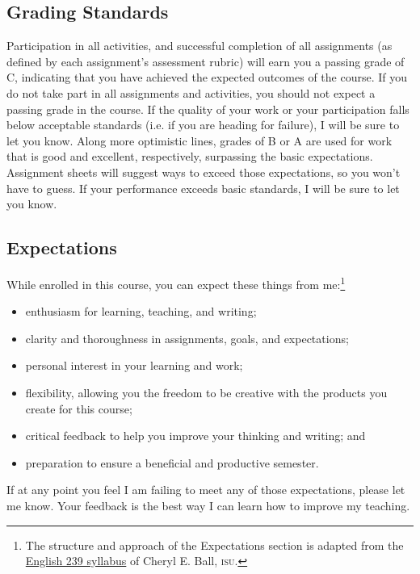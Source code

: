 \documentclass[11pt,oneside]{amsart}	%
\begin{document}
\subsection{Grading Standards} %
\label{sub:grading_standards}
Participation in all activities, and successful completion of all assignments (as defined by each assignment's assessment rubric) will earn you a passing grade of C, indicating that you have achieved the expected outcomes of the course. If you do not take part in all assignments and activities, you should not expect a passing grade in the course. If the quality of your work or your participation falls below acceptable standards (i.e. if you are heading for failure), I will be sure to let you know. Along more optimistic lines, grades of B or A are used for work that is good and excellent, respectively, surpassing the basic expectations. Assignment sheets will suggest ways to exceed those expectations, so you won't have to guess. If your performance exceeds basic standards, I will be sure to let you know.





\subsection{Expectations} %
\label{sub:expectations}

While enrolled in this course, you can expect these things from me:\footnote{The structure and approach of the Expectations section is adapted from the \href{http://www.ceball.com/classes/239/spring09/?page_id=8}{English 239 syllabus} of Cheryl E. Ball, \textsc{isu}.}
\begin{itemize}
	\item enthusiasm for learning, teaching, and writing;
	\item clarity and thoroughness in assignments, goals, and expectations;
	\item personal interest in your learning and work;
	\item flexibility, allowing you the freedom to be creative with the products you create for this course;
	\item critical feedback to help you improve your thinking and writing; and
	\item preparation to ensure a beneficial and productive semester.
\end{itemize}
If at any point you feel I am failing to meet any of those expectations, please let me know. Your feedback is the best way I can learn how to improve my teaching.
\end{document}
